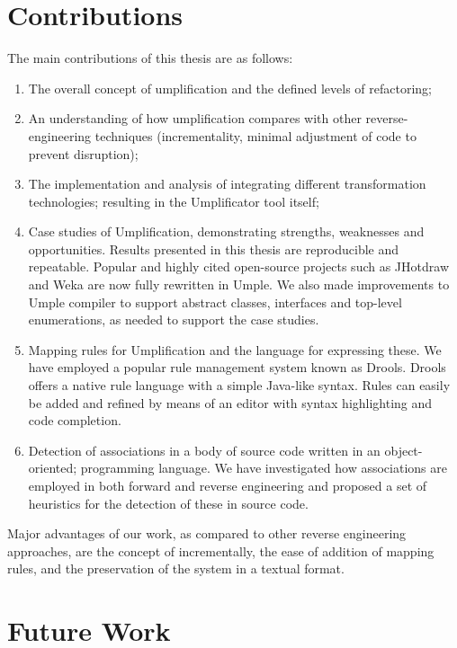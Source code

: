 \section{Contributions}

The main contributions of this thesis are as follows:

\begin{enumerate}
\item The overall concept of umplification and the defined levels of refactoring;

\item An understanding of how umplification compares with other reverse-engineering techniques (incrementality, minimal adjustment of code to prevent disruption);

\item The implementation and analysis of integrating different transformation technologies;  resulting in the Umplificator tool itself;

\item Case studies of Umplification, demonstrating strengths, weaknesses and opportunities. Results presented in this thesis are reproducible and repeatable. Popular and highly cited open-source projects such as JHotdraw and Weka are now fully rewritten in Umple. We also made improvements to Umple compiler  to support abstract classes, interfaces and top-level enumerations, as needed to support the case studies.

\item Mapping rules for Umplification and the language for expressing these. We have employed a popular rule management system known as Drools. Drools offers a native rule language with a simple Java-like syntax. Rules can easily be added and refined by means of an editor with syntax highlighting and code completion.

\item Detection of associations in a body of source code written in an object-oriented;
programming language. We have investigated how associations are employed in both forward and reverse engineering and proposed a set of heuristics for the detection of these in source code.
\end{enumerate}
Major advantages of our work, as compared to other reverse engineering approaches, are the concept of incrementally, the ease of addition of mapping rules, and the preservation of the system in a textual format.

\section{Future Work}

